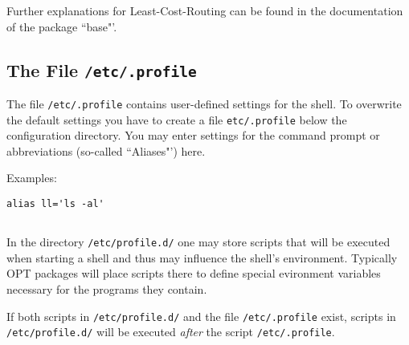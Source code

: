Further explanations for Least-Cost-Routing can be found in the documentation of the package ``base"'.
    
\subsection{The File \texttt{/etc/.profile}}

The file \texttt{/etc/.profile} contains user-defined settings for the
shell. To overwrite the default settings you have to create a file \texttt{etc/.profile}
below the configuration directory. You may enter settings for the command prompt or abbreviations
(so-called ``Aliases"') here.


Examples:

\begin{example}
\begin{verbatim}
alias ll='ls -al'
\end{verbatim}
\end{example}

\subsection{}

In the directory \texttt{/etc/profile.d/} one may store scripts that will be executed
when starting a shell and thus may influence the shell's environment. 
Typically OPT packages will place scripts there to define special evironment variables
necessary for the programs they contain.

If both scripts in \texttt{/etc/profile.d/} and the
file \texttt{/etc/.profile} exist, scripts in \texttt{/etc/profile.d/}
will be executed \emph{after} the script \texttt{/etc/.profile}.
